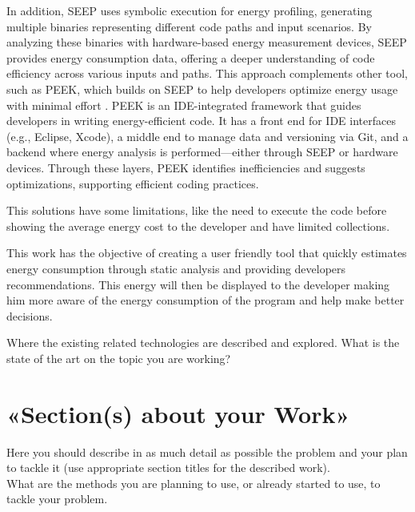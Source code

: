 \documentclass[sigplan]{acmart}
\begin{document}
In addition, SEEP \cite{10.1145/2094091.2094106} uses symbolic execution for energy profiling, generating multiple binaries representing different code paths and input scenarios. By analyzing these binaries with hardware-based energy measurement devices, SEEP provides energy consumption data, offering a deeper understanding of code efficiency across various inputs and paths. This approach complements other tool, such as PEEK, which builds on SEEP to help developers optimize energy usage with minimal effort \cite{187026}. PEEK is an IDE-integrated framework that guides developers in writing energy-efficient code. It has a front end for IDE interfaces (e.g., Eclipse, Xcode), a middle end to manage data and versioning via Git, and a backend where energy analysis is performed—either through SEEP or hardware devices. Through these layers, PEEK identifies inefficiencies and suggests optimizations, supporting efficient coding practices.


This solutions have some limitations, like the need to execute the code before showing the average energy cost to the developer and have limited collections.

This work has the objective of creating a user friendly tool that quickly estimates energy consumption through static analysis and providing developers recommendations. This energy will then be displayed to the developer making him more aware of the energy consumption of the program and help make better decisions.




% 

Where the existing related technologies are described and explored. What is the state of the art on the topic you are working? 



\section{«Section(s) about your Work»} \label{sec:work1}

Here you should describe in as much detail as possible the problem and your plan to tackle it (use appropriate section titles for the described work). \\

What are the methods you are planning to use, or already started to use, to tackle your problem. \\
\end{document}
